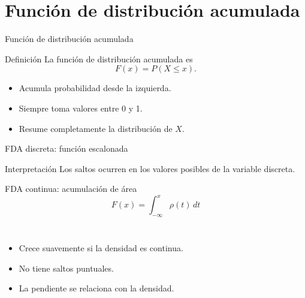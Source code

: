 \documentclass[aspectratio=169,11pt]{beamer}
\begin{document}
\section{Función de distribución acumulada}

\begin{frame}{Función de distribución acumulada}
\begin{block}{Definición}
La función de distribución acumulada es
\[
F(x)=P(X\le x).
\]
\end{block}
\begin{itemize}
  \item Acumula probabilidad desde la izquierda.
  \item Siempre toma valores entre 0 y 1.
  \item Resume completamente la distribución de $X$.
\end{itemize}
\end{frame}

\begin{frame}{FDA discreta: función escalonada}
\centering
{}
\begin{alertblock}{Interpretación}
Los saltos ocurren en los valores posibles de la variable discreta.
\end{alertblock}
\end{frame}

\begin{frame}{FDA continua: acumulación de área}
\[
F(x)=\int_{-\infty}^{x}\rho(t)\,dt
\]
\begin{columns}[T]
\begin{itemize}
  \item Crece suavemente si la densidad es continua.
  \item No tiene saltos puntuales.
  \item La pendiente se relaciona con la densidad.
\end{itemize}
\end{columns}
\end{frame}
\end{document}
